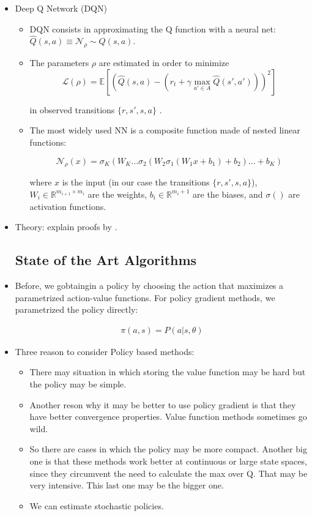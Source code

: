 \documentclass[11pt,english]{article}
\newcommand{\E}{\mathbb{E}}
\begin{document}
\begin{itemize}
	\item Deep Q Network (DQN)
	\begin{itemize}
		\item DQN consists in approximating the Q function with a neural net: $\hat{Q}(s,a) \equiv  \mathcal{N}_\rho \sim Q(s,a)$.\medskip
		\item The parameters $\rho$ are estimated in order to minimize\medskip
		$$\mathcal{L}(\rho)=\E \left[ \left(\hat{Q}(s,a)-(r_t+\gamma \max_{a' \in A} \hat{Q}(s',a')) \right)^2 \right] $$
		
		in observed transitions $\{r, s'  ,s, a\}$ .\medskip
		
		\item The most widely used NN is a composite function made of nested linear functions:  \medskip
		
		$$\mathcal{N}_\rho (x)=\sigma_K(W_K ... \sigma_2(W_2 \sigma_1(W_1x+b_1)+b_2)...+b_K)$$
		
		where $x$ is the input (in our case the transitions $\{r, s'  ,s, a\}$), $W_i \in \mathbb{R}^{m_{i+1}\times m_i}$ are the weights, $b_i \in \mathbb{R}^{m_i+1}$ are the biases, and $\sigma()$ are activation functions.
	\end{itemize}

	\item Theory: explain proofs by \citet{maei2009}.

\subsection{State of the Art Algorithms}

	\item Before, we gobtaingin a policy by choosing the action that maximizes a parametrized action-value functions. For policy gradient methods, we parametrized the policy directly:
	
	\begin{align*}
	\pi(a,s) = P(a| s, \theta)
	\end{align*}
	
	\item Three reason to consider Policy based methods:
	
	\begin{itemize}
		\item There may situation in which storing the value function may be hard but the policy may be simple.
		\item Another reson why it may be better to use policy gradient is that they have better convergence properties. Value function methods sometimes go wild. 
		\item So there are cases in which the policy may be more compact. Another big one is that these methods work better at continuous or large state spaces, since they circumvent the need to calculate the max over Q. That may be very intensive. This last one may be the bigger one.
		\item We can estimate stochastic policies. 
	\end{itemize}  


\end{itemize}
\end{document}
